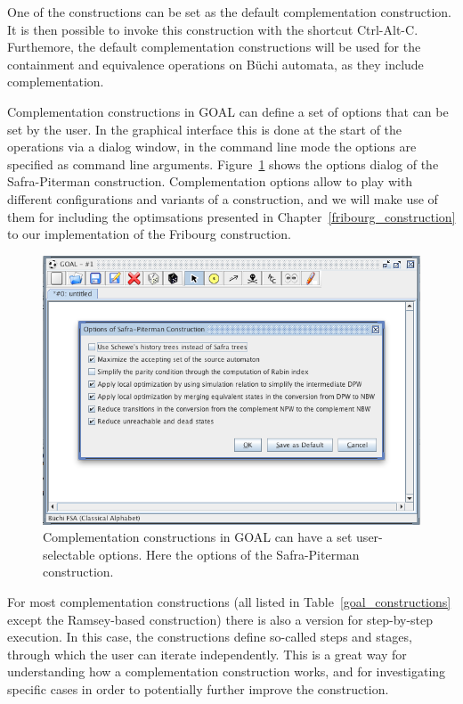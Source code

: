 One of the constructions can be set as the default complementation construction. It is then possible to invoke this construction with the shortcut Ctrl-Alt-C. Furthemore, the default complementation constructions will be used for the containment and equivalence operations on Büchi automata, as they include complementation.

Complementation constructions in GOAL can define a set of options that can be set by the user. In the graphical interface this is done at the start of the operations via a dialog window, in the command line mode the options are specified as command line arguments. Figure~\ref{goal_complementation_options} shows the options dialog of the Safra-Piterman construction. Complementation options allow to play with different configurations and variants of a construction, and we will make use of them for including the optimsations presented in Chapter~\ref{fribourg_construction} to our implementation of the Fribourg construction.


\begin{figure}
\begin{center}
\includegraphics[scale=0.5]{figures/goal_complementation_options.png}
\caption{Complementation constructions in GOAL can have a set user-selectable options. Here the options of the Safra-Piterman construction.}
\label{goal_complementation_options}
\end{center}
\end{figure}

For most complementation constructions (all listed in Table~\ref{goal_constructions} except the Ramsey-based construction) there is also a version for step-by-step execution. In this case, the constructions define so-called steps and stages, through which the user can iterate independently. This is a great way for understanding how a complementation construction works, and for investigating specific cases in order to potentially further improve the construction. 



